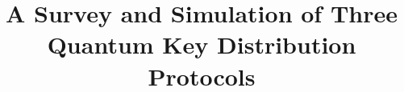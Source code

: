 \documentclass[conference]{IEEEtran}
\begin{document}
\newcommand{\iu}{{i\mkern1mu}}
%
\title{A Survey and Simulation of Three Quantum Key Distribution Protocols}

\author{
}


%








\maketitle
\end{document}
